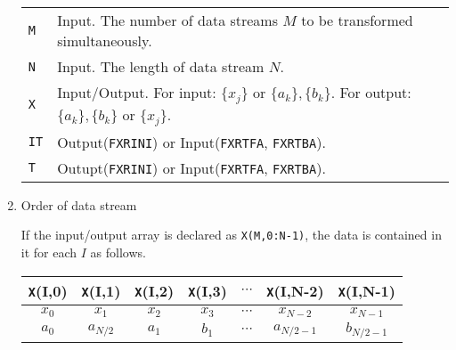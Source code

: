 \documentclass[a4paper]{scrartcl}
\begin{document}
\begin{enumerate}
     \vspace{-1ex}
     
    \begin{tabular}{ll}
      \texttt{M}&Input. The number of data
      streams $M$ to be transformed simultaneously.\\
      \texttt{N} & Input. The length of data stream $N$.\\
      \texttt{X} & Input/Output. For input: $\{x_j\}$ or
      $\{a_k\},\{b_k\}$. For output: $\{a_k\},\{b_k\}$ or $\{x_j\}$.\\
      \texttt{IT} & Output(\texttt{FXRINI}) or 
               Input(\texttt{FXRTFA}, \texttt{FXRTBA}).\\
      \texttt{T} & Outupt(\texttt{FXRINI}) or 
    Input(\texttt{FXRTFA}, \texttt{FXRTBA}).
    \end{tabular}

  \item Order of data stream

  If the input/output array is declared as \texttt{X(M,0:N-1)},
  the data is contained in it for each $I$ as follows.

    \begin{tabular}{|c|c|c|c|c|c|c|}\hline
     \texttt X(I,0) & \texttt X(I,1) & \texttt X(I,2) & \texttt X(I,3) & 
     $\cdots$ & \texttt X(I,N-2) & \texttt X(I,N-1) \\\hline\hline
      $x_0$ & $x_1$ & $x_2$ & $x_3$ &
     $\cdots$ & $x_{N-2}$ & $x_{N-1}$ \\\hline
      $a_0$ & $a_{N/2}$ & $a_1$ & $b_1$ &
     $\cdots$ & $a_{N/2-1}$ & $b_{N/2-1}$ \\\hline
    \end{tabular}

\end{enumerate}
\end{document}
